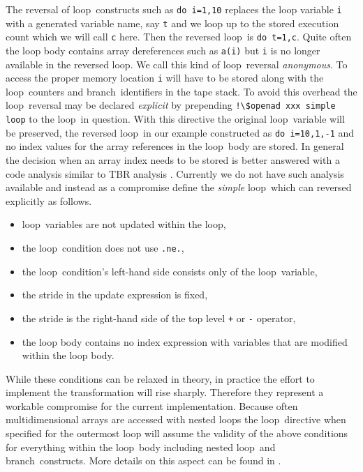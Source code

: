 \documentclass{book}
\newcommand{\Loop}{loop}
\newcommand{\branch}{branch}
\begin{document}
The reversal of  \Loop\ constructs such as \lstinline{do i=1,10} replaces 
the loop variable \lstinline{i} with a generated variable name, say \lstinline{t} and we 
loop up to  the stored execution count which we will call  \lstinline{c} here. 
Then the reversed \Loop\ is \lstinline{do t=1,c}. Quite often the loop body contains 
array dereferences such as \lstinline{a(i)} but \lstinline{i} is no longer available in the 
reversed \Loop. We call this kind of \Loop\ reversal {\em anonymous}. 
To access the proper memory location \lstinline{i} will have to be stored along with the 
\Loop\ counters and \branch\ identifiers in the tape stack.
To avoid this overhead the \Loop\ reversal may be declared {\em explicit}
by prepending \lstinline{!\$openad xxx simple loop} to the \Loop\ in question. 
With this directive the original \Loop\ variable will be preserved,  
the reversed \Loop\ in our example constructed as \lstinline{do i=10,1,-1} and 
no index values for the array references in the \Loop\ body are stored. 
In general the decision when an array index needs to be stored is better answered 
with a code analysis similar to TBR analysis \cite{Hascoet2005bra}. 
Currently we do not have such  analysis available and instead 
as a compromise define the {\em simple}
\Loop\ which can reversed explicitly as follows. 
\begin{itemize}
  \parskip = -2pt
\item \Loop\ variables are not updated within the loop,
\item the \Loop\ condition does not use \lstinline{.ne.},
\item the \Loop\ condition's left-hand side consists only of the \Loop\ variable,
\item the stride in the update expression is fixed,
\item the stride is the right-hand side of the top level \lstinline{+} or \lstinline{-} operator,
\item the loop body contains no index expression with variables that are modified within the loop body.
\end{itemize}
While these conditions can be relaxed in theory, in practice the effort to implement 
the transformation will rise sharply. Therefore they represent a workable compromise 
for the current implementation. 
Because often multidimensional arrays  are accessed with nested loops the 
\Loop\ directive when specified for the outermost loop will assume the validity 
of the above conditions for everything within the \Loop\ body including nested 
\Loop\ and \branch\ constructs. More details on this aspect can be found in 
\cite{Utke2006ERo}. 
\end{document}
